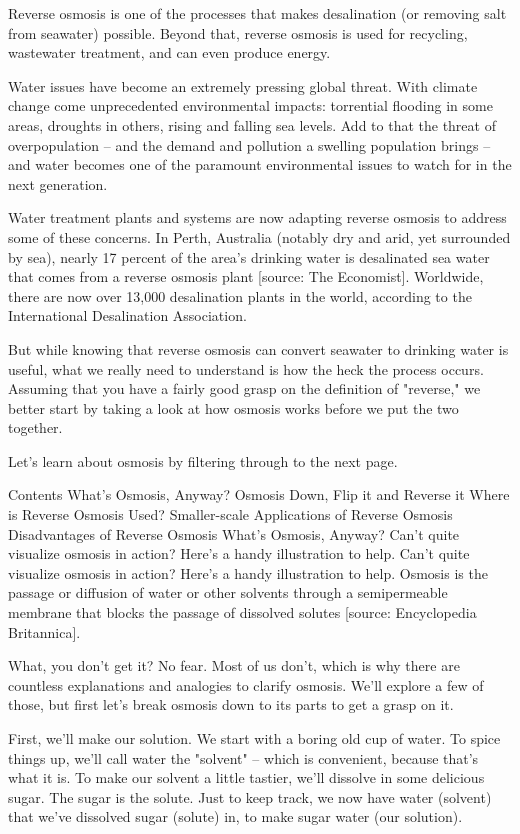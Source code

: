 Reverse osmosis is one of the processes that makes desalination (or removing salt from seawater) possible. Beyond that, reverse osmosis is used for recycling, wastewater treatment, and can even produce energy.

Water issues have become an extremely pressing global threat. With climate change come unprecedented environmental impacts: torrential flooding in some areas, droughts in others, rising and falling sea levels. Add to that the threat of overpopulation -- and the demand and pollution a swelling population brings -- and water becomes one of the paramount environmental issues to watch for in the next generation.

Water treatment plants and systems are now adapting reverse osmosis to address some of these concerns. In Perth, Australia (notably dry and arid, yet surrounded by sea), nearly 17 percent of the area's drinking water is desalinated sea water that comes from a reverse osmosis plant [source: The Economist]. Worldwide, there are now over 13,000 desalination plants in the world, according to the International Desalination Association.

But while knowing that reverse osmosis can convert seawater to drinking water is useful, what we really need to understand is how the heck the process occurs. Assuming that you have a fairly good grasp on the definition of "reverse," we better start by taking a look at how osmosis works before we put the two together.

Let's learn about osmosis by filtering through to the next page.

Contents
What's Osmosis, Anyway?
Osmosis Down, Flip it and Reverse it
Where is Reverse Osmosis Used?
Smaller-scale Applications of Reverse Osmosis
Disadvantages of Reverse Osmosis
What's Osmosis, Anyway?
Can't quite visualize osmosis in action? Here's a handy illustration to help.
Can't quite visualize osmosis in action? Here's a handy illustration to help.
Osmosis is the passage or diffusion of water or other solvents through a semipermeable membrane that blocks the passage of dissolved solutes [source: Encyclopedia Britannica].

What, you don't get it? No fear. Most of us don't, which is why there are countless explanations and analogies to clarify osmosis. We'll explore a few of those, but first let's break osmosis down to its parts to get a grasp on it.

First, we'll make our solution. We start with a boring old cup of water. To spice things up, we'll call water the "solvent" -- which is convenient, because that's what it is. To make our solvent a little tastier, we'll dissolve in some delicious sugar. The sugar is the solute. Just to keep track, we now have water (solvent) that we've dissolved sugar (solute) in, to make sugar water (our solution).


